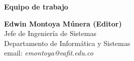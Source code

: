 \begin{center}
{\bf \Huge Equipo de trabajo}
\end{center}
\vspace{1cm}

\begin{center}
\textbf{Edwin Montoya Múnera (Editor)}\\
Jefe de Ingeniería de Sistemas \\
Departamento de Informática y Sistemas \\
email: \textit{emontoya@eafit.edu.co}\\
\end{center}

\newpage
